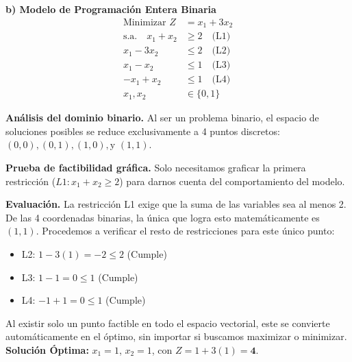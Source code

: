 \documentclass[10pt,a4paper]{article}
\begin{document}
\vspace{0.8cm}
\textbf{\large b) Modelo de Programación Entera Binaria}
\begin{align*}
    \text{Minimizar } Z &= x_1 + 3x_2 \\
    \text{s.a.} \quad 
    x_1 + x_2 &\ge 2 \quad \text{(L1)} \\
    x_1 - 3x_2 &\le 2 \quad \text{(L2)} \\
    x_1 - x_2 &\le 1 \quad \text{(L3)} \\
    -x_1 + x_2 &\le 1 \quad \text{(L4)} \\
    x_1, x_2 &\in \{0, 1\}
\end{align*}

\textbf{Análisis del dominio binario.} Al ser un problema binario, 
el espacio de soluciones posibles se reduce exclusivamente a 4 puntos discretos:
 $(0,0), (0,1), (1,0), \text{y } (1,1)$. 

\textbf{Prueba de factibilidad gráfica.} Solo necesitamos graficar la primera restricción ($L1: x_1 + x_2 \ge 2$) para darnos cuenta del comportamiento del modelo.

\begin{center}
\end{center}

\textbf{Evaluación.} La restricción L1 exige que la suma de las variables sea al menos 2. De las 4 coordenadas binarias, la única que logra esto matemáticamente es $(1,1)$. Procedemos a verificar el resto de restricciones para este único punto:
\begin{itemize}
    \item L2: $1 - 3(1) = -2 \le 2$ (Cumple)
    \item L3: $1 - 1 = 0 \le 1$ (Cumple)
    \item L4: $-1 + 1 = 0 \le 1$ (Cumple)
\end{itemize}
Al existir solo un punto factible en todo el espacio vectorial, este se convierte automáticamente en el óptimo, sin importar si buscamos maximizar o minimizar. \\
\textbf{Solución Óptima:} $x_1 = 1$, $x_2 = 1$, con $Z = 1 + 3(1) = \mathbf{4}$.
\end{document}

